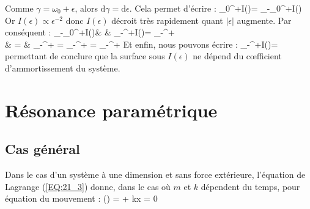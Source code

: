 Comme $\gamma = \omega_{0} + \epsilon$, alors $\mathrm{d}\gamma = \mathrm{d}\epsilon$. Cela permet d'\'{e}crire :
\benn
	\int_{0}^{+\infty}I(\gamma)\gamma = \int_{-\omega_{0}}^{+\infty}I(\epsilon)\epsilon
\eenn
Or $I(\epsilon) \propto \epsilon^{-2}$ donc $I(\epsilon)$ d\'{e}croit tr\`{e}s rapidement quant $\lvert\epsilon\rvert$ augmente. Par cons\'{e}quent :
\bea
	\int_{-\omega_{0}}^{+\infty}I(\epsilon)\epsilon & \approx & \int_{-\infty}^{+\infty}I(\epsilon)\epsilon = \int_{-\infty}^{+\infty} \nonumber \\
	& = & \int_{-\infty}^{+\infty} = \int_{-\infty}^{+\infty} = \left[\arctan\right]_{-\infty}^{+\infty} \nonumber
\eea
Et enfin, nous pouvons \'{e}crire :
\be
	\int_{-\infty}^{+\infty}I(\epsilon)\epsilon =  \label{EQ:26_10}
\ee
permettant de conclure que la surface sous $I(\epsilon)$ ne d\'{e}pend du c{\oe}fficient d'ammortissement du syst\`{e}me.

\section{R\'{e}sonance param\'{e}trique}

\subsection{Cas g\'{e}n\'{e}ral}

Dans le cas d'un syst\`{e}me \`{a} une dimension et sans force ext\'{e}rieure, l'\'{e}quation de Lagrange (\ref{EQ:21_3}) donne, dans le cas o\`{u} $m$ et $k$ d\'{e}pendent du temps, pour \'{e}quation du mouvement :
\be
	\left(\right) =  \Leftrightarrow {} + kx = 0 \label{EQ:27_1}
\ee

